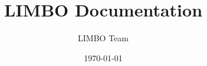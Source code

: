 \documentclass[11pt,a4paper]{report}
\begin{document}
\title{LIMBO Documentation}
\author{LIMBO Team}
\date{\today}

\maketitle
\tableofcontents








\end{document}
